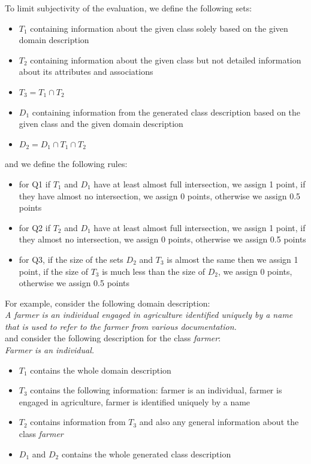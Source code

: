 \noindent{}To limit subjectivity of the evaluation, we define the following sets:

\begin{itemize}
\item $T_1$ containing information about the given class solely based on the given domain description
\item $T_2$ containing information about the given class but not detailed information about its attributes and associations
\item $T_3 = T_1 \cap T_2$
\item $D_1$ containing information from the generated class description based on the given class and the given domain description
\item $D_2 = D_1 \cap T_1 \cap T_2$
\end{itemize}

\noindent{}and we define the following rules:
\begin{itemize}
\item for Q1 if $T_1$ and $D_1$ have at least almost full intersection, we assign 1 point, if they have almost no intersection, we assign 0 points, otherwise we assign 0.5 points
\item for Q2 if $T_2$ and $D_1$ have at least almost full intersection, we assign 1 point, if they almost no intersection, we assign 0 points, otherwise we assign 0.5 points
\item for Q3, if the size of the sets $D_2$ and $T_3$ is almost the same then we assign 1 point, if the size of $T_3$ is much less than the size of $D_2$, we assign 0 points, otherwise we assign 0.5 points
\end{itemize}


\noindent{}For example, consider the following domain description: \\

\noindent{}\textit{A farmer is an individual engaged in agriculture identified uniquely by a name that is used to refer to the farmer from various documentation.} \\

\noindent{}and consider the following description for the class \textit{farmer}: \\

\noindent{}\textit{Farmer is an individual.}

\begin{itemize}
\item $T_1$ contains the whole domain description
\item $T_3$ contains the following information: farmer is an individual, farmer is engaged in agriculture, farmer is identified uniquely by a name
\item $T_2$ contains information from $T_3$ and also any general information about the class \textit{farmer}
\item $D_1$ and $D_2$ contains the whole generated class description
\end{itemize}

